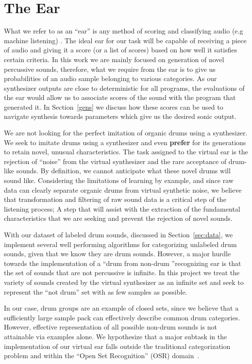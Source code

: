 \documentclass[\main/thesis.tex]{subfiles}
\begin{document}
\section{The Ear}

What we refer to as an \enquote{ear} is any method of scoring and classifying audio (e.g machine listening) \cite{malkin2006machine,rowe1992interactive}. The ideal ear for our task will be capable of receiving a piece of audio and giving it a score (or a list of scores) based on how well it satisfies certain criteria. In this work we are mainly focused on generation of novel percussive sounds, therefore, what we require from the ear is to give us probabilities of an audio sample belonging to various categories. As our synthesizer outputs are close to deterministic for all programs, the evaluations of the ear would allow us to associate scores of the sound with the program that generated it. In Section~\ref{gens} we discuss how these scores can be used to navigate synthesis towards parameters which give us the desired sonic output.

We are not looking for the perfect imitation of organic drums using a synthesizer. We seek to imitate drums using a synthesizer and even \textbf{prefer} for its generations to retain novel, unusual characteristics. The task assigned to the virtual ear is the rejection of \enquote{noise} from the virtual synthesizer and the rare acceptance of drum-like sounds. By definition, we cannot anticipate what these novel drums will sound like. Considering the limitations of learning by example, and since raw data can clearly separate organic drums from virtual synthetic noise, we believe that transformation and filtering of raw sound data is a critical step of the listening process; A step that will assist with the extraction of the fundamental characteristics that we are seeking and prevent the rejection of novel sounds.

 With our dataset of labeled drum sounds, discussed in Section~\ref{sec:data}, we implement several well performing algorithms for categorizing unlabeled drum sounds, given that we know they are drum sounds. However, a major hurdle towards the implementation of a \textquotedblleft drum from non-drum \textquotedblright recognizing ear is that the set of sounds that are not percussive is infinite. In this project we treat the variety of sounds created by the virtual synthesizer as an infinite set and seek to represent the \enquote{not drum} set with as few samples as possible.

 
In our case, drum groups are an example of closed sets, since we believe that a sufficiently large sample pack can effectively describe common drum categories. However, effective representation of all possible non-drum sounds is not attainable via examples alone. We hypothesize that a major subtask in the implementation of our virtual ear falls outside the traditional categorization problem and within the \enquote{Open Set Recognition} (OSR) domain~\cite{geng2020recent,mundt2019open}. 
\end{document}
